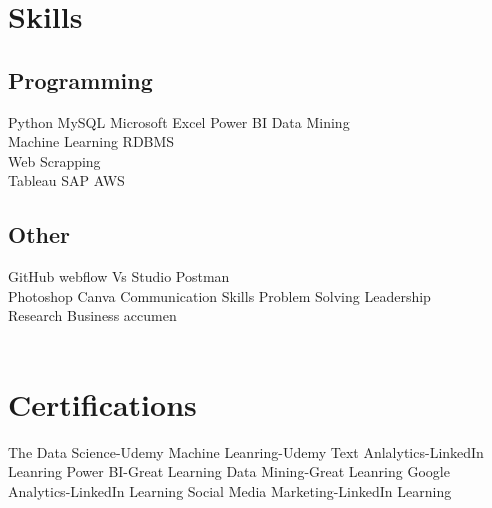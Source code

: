 \documentclass[]{deedy-resume-openfont}
\begin{document}
\begin{minipage}[t]{0.33\textwidth}



\section{Skills}
\subsection{Programming}
Python \textbullet{}   MySQL \textbullet{} Microsoft Excel \textbullet{} Power BI \textbullet{} Data Mining \textbullet{}  \\ Machine Learning \textbullet{} RDBMS\\ Web Scrapping \\ 
\sectionsep
{}
Tableau \textbullet{} SAP \textbullet{} AWS
\sectionsep

\subsection{Other}
GitHub \textbullet{}   webflow \textbullet{} Vs Studio \textbullet{} Postman \\
Photoshop \textbullet{} Canva \textbullet{} Communication Skills  \textbullet{} Problem Solving \textbullet{} Leadership \\ 
Research \textbullet{} Business accumen \\
\\
\section{Certifications}
The Data Science-Udemy \textbullet{} Machine Leanring-Udemy \textbullet{} Text Anlalytics-LinkedIn Leanring \textbullet{} Power BI-Great Learning \textbullet{} Data Mining-Great Leanring  \textbullet{} Google Analytics-LinkedIn Learning \textbullet{} Social Media Marketing-LinkedIn Learning \\ 
\sectionsep
%
%

\end{minipage} 
\hfill
\end{document}
